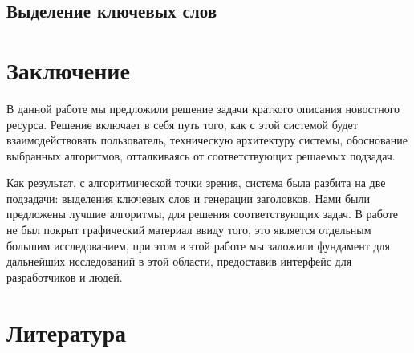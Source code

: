 \documentclass[aps,%
12pt,%
final,%
oneside,
onecolumn,%
musixtex, %
superscriptaddress,%
centertags]{article} %
\begin{document}
\subsection{Выделение ключевых слов}





\section{Заключение}

В данной работе мы предложили решение задачи краткого описания новостного ресурса. Решение включает в себя путь того, как с этой системой будет взаимодействовать пользователь, техническую архитектуру системы, обоснование выбранных алгоритмов, отталкиваясь от соответствующих решаемых подзадач.

Как результат, с алгоритмической точки зрения, система была разбита на две подзадачи: выделения ключевых слов и генерации заголовков. Нами были предложены лучшие алгоритмы, для решения соответствующих задач. В работе не был покрыт графический материал ввиду того, это является отдельным большим исследованием, при этом в этой работе мы заложили фундамент для дальнейших исследований в этой области, предоставив интерфейс для разработчиков и людей.

\section{Литература}



\end{document}
